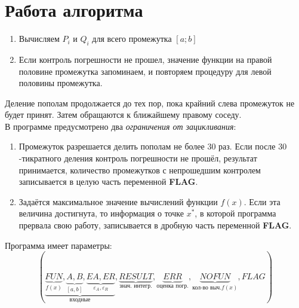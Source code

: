 \documentclass[a4paper,11pt]{article}
\begin{document}
\section{Работа алгоритма}
\begin{enumerate}
  \item Вычисляем $P_i$ и $Q_i$ для всего промежутка $[a; b]$
  \item Если контроль погрешности не прошел, значение функции на правой половине промежутка запоминаем, и повторяем процедуру для левой половины промежутка.
\end{enumerate}
Деление пополам продолжается до тех пор, пока крайний слева промежуток не будет принят. Затем обращаются к ближайшему правому соседу. \\

В программе предусмотрено два \textit{ограничения от зацикливания}:
\begin{enumerate}
  \item Промежуток разрешается делить пополам не более $30$ раз. Если после $30$-тикратного деления контроль погрешности не прошёл, результат принимается,
        количество промежутков с непрошедшим контролем записывается в целую часть переменной \textbf{FLAG}.
  \item Задаётся максимальное значение вычислений функции $f(x)$. Если эта величина достигнута, то информация о точке $x^*$, в которой программа прервала
        свою работу, записывается в дробную часть переменной \textbf{FLAG}.
\end{enumerate}
Программа имеет параметры:
\begin{equation*}
  (\underbrace{\underbrace{FUN}_{f(x)}, \underbrace{A, B}_{[a, b]}, \underbrace{EA, ER}_{\varepsilon_A, \varepsilon_R}}_{\text{входные}}, \underbrace{RESULT}_{\text{знач. интегр.}},
    \underbrace{ERR}_{\text{оценка погр.}}, \underbrace{NOFUN}_{\text{кол-во выч.} f(x)}, FLAG)
\end{equation*}
\end{document}
